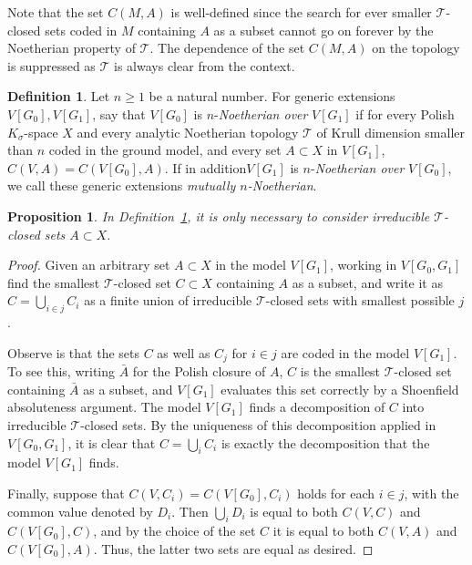 \documentclass{article}
\newcommand{\gs}{\sigma}
\newtheorem{proposition}[theorem]{Proposition}
\theoremstyle{definition}
\newtheorem{definition}[theorem]{Definition}
\begin{document}
\noindent Note that the set $C(M, A)$ is well-defined since the search for ever smaller $\mathcal{T}$-closed sets coded in $M$ containing $A$ as a subset cannot go on forever by the Noetherian property of $\mathcal{T}$. The dependence of the set $C(M, A)$ on the topology is suppressed as $\mathcal{T}$ is always clear from the context.


\begin{definition}
\label{nnoetheriandefinition}
Let $n\geq 1$ be a natural number. For generic extensions $V[G_0], V[G_1]$, say that $V[G_0]$ is $n$-\emph{Noetherian over} $V[G_1]$ if for every Polish $K_\gs$-space $X$ and every analytic Noetherian topology $\mathcal{T}$ of Krull dimension smaller than $n$ coded in the ground model, and every set $A\subset X$ in $V[G_1]$, $C(V, A)=C(V[G_0], A)$. If in addition$V[G_1]$ is $n$-\emph{Noetherian over} $V[G_0]$, we call these generic extensions \emph{mutually $n$-Noetherian}.
\end{definition}

\begin{proposition}
\label{enoughproposition}
In Definition~\ref{nnoetheriandefinition}, it is only necessary to consider irreducible $\mathcal{T}$-closed sets $A\subset X$.
\end{proposition}

\begin{proof}
 Given an arbitrary set $A\subset X$ in the model $V[G_1]$, working in $V[G_0, G_1]$ find the smallest $\mathcal{T}$-closed set $C\subset X$ containing $A$ as a subset, and write it as $C=\bigcup_{i\in j}C_i$ as a finite union of irreducible $\mathcal{T}$-closed sets with smallest possible $j$. 

Observe is that the sets $C$ as well as $C_j$ for $i\in j$ are coded in the model $V[G_1]$. To see this, writing $\bar A$ for the Polish closure of $A$, $C$ is the smallest $\mathcal{T}$-closed set containing $\bar A$ as a subset, and $V[G_1]$ evaluates this set correctly by a Shoenfield absoluteness argument. The model $V[G_1]$ finds a decomposition of $C$ into irreducible $\mathcal{T}$-closed sets. By the uniqueness of this decomposition applied in $V[G_0, G_1]$, it is clear that $C=\bigcup_iC_i$ is exactly the decomposition that the model $V[G_1]$ finds.

Finally, suppose that  $C(V, C_i)=C(V[G_0], C_i)$ holds for each $i\in j$, with the common value denoted by $D_i$. Then $\bigcup_iD_i$ is equal to both $C(V, C)$ and $C(V[G_0], C)$, and by the choice of the set $C$ it is equal to both $C(V, A)$ and $C(V[G_0], A)$. Thus, the latter two sets are equal as desired.
\end{proof}
\end{document}
